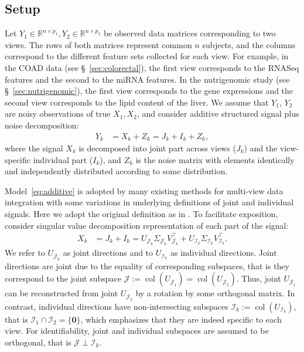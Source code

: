 \documentclass{amsart}
\def\R{\mathbb{R}} %
\DeclareMathOperator*{\col}{col}
\newcommand{\Jcal}{\mathcal{J}}
\newcommand{\Ical}{\mathcal{I}}
\begin{document}
\subsection{Setup}
Let $Y_1\in \R^{n \times p_1}, Y_2\in \R^{n \times p_2}$ be observed data matrices corresponding to two views. The rows of both matrices represent common $n$ subjects, and the columns correspond to the different feature sets collected for each view. For example, in the COAD data (see \S~\ref{sec:colorectal}), the first view corresponds to the RNASeq features and the second to the miRNA features. In the nutrigenomic study (see \S~\ref{sec:nutrigenomic}), the first view corresponds to the gene expressions and the second view corresponds to the lipid content of the liver. We assume that $Y_1$, $Y_2$ are noisy observations of true $X_1, X_2$, and consider additive structured signal plus noise decomposition:
\begin{align}\label{eq:additive}
    Y_k &= X_k + Z_k = J_k + I_k + Z_k,
\end{align}
where the signal $X_k$ is decomposed into joint part across views ($J_k$) and the view-specific individual part ($I_k$), and $Z_k$ is the noise matrix with elements identically and independently distributed according to some distribution. 

Model~\eqref{eq:additive} is adopted by many existing methods for multi-view data integration \citep{lock2013joint, feng2018angle, gaynanova2019structural, shu2019d, park2020integrative, yi2023hierarchical,prothero2024data} with some variations in underlying definitions of joint and individual signals. Here we adopt the original definition as in \citet{lock2013joint}. To facilitate exposition, consider singular value decomposition representation of each part of the signal:
\begin{align}
X_k &= J_k + I_k = U_{\Jcal_k} \Sigma_{\Jcal_k} V^\top_{\Jcal_k} +  U_{\Ical_k} \Sigma_{\Ical_k} V^\top_{\Ical_k}.
\end{align}
We refer to $U_{\Jcal_k}$ as joint directions and to $U_{\Ical_k}$ as individual directions.
Joint directions are joint due to the equality of corresponding subspaces, that is they correspond to the joint subspace $\Jcal := \col(U_{\Jcal_1}) = \col(U_{\Jcal_2})$. Thus, joint $U_{\Jcal_1}$ can be reconstructed from joint $U_{\Jcal_2}$ by a rotation by some orthogonal matrix. In contrast, individual directions have non-intersecting subspaces $\Ical_k := \col(U_{\Ical_k})$, that is $\Ical_1 \cap \Ical_2 = \{\mathbf{0}\}$, which emphasizes that they are indeed specific to each view. For identifiability, joint and individual subspaces are assumed to be orthogonal, that is $\Jcal \perp \Ical_k$.
\end{document}
